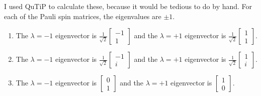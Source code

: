 \documentclass{article}
\begin{document}
\bigskip
\begin{prob}
\end{prob}
I used QuTiP to calculate these, because it would be tedious to do by hand. For each of the Pauli spin matrices, the eigenvalues are $\pm 1$.
\begin{enumerate}[label=(\alph*)]
    \item The $\lambda=-1$ eigenvector is $\frac{1}{\sqrt{2}} \begin{bmatrix}
        -1 \\
        1
\end{bmatrix}$ and the $\lambda=+1$ eigenvector is $\frac{1}{\sqrt{2}} \begin{bmatrix}
    1 \\
    1
\end{bmatrix}$.
    \item The $\lambda=-1$ eigenvector is $\frac{1}{\sqrt{2}} \begin{bmatrix}
        -1 \\
        i
\end{bmatrix}$ and the $\lambda=+1$ eigenvector is $\frac{1}{\sqrt{2}} \begin{bmatrix}
    1 \\
    i
\end{bmatrix}$.
    \item The $\lambda=-1$ eigenvector is $\begin{bmatrix}
        0 \\
        1
\end{bmatrix}$ and the $\lambda=+1$ eigenvector is $\begin{bmatrix}
    1 \\
    0
\end{bmatrix}$.
\end{enumerate}
\end{document}
